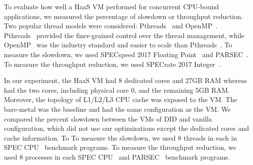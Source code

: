 



To evaluate how well a HaaS VM performed for concurrent
CPU-bound applications, we measured the percentage of slowdown
or throughput reduction. Two popular thread models were
considered: Pthreads~\cite{lewis:1998} and
OpenMP~\cite{dagum:1998}. Pthreads~\cite{lewis:1998} provided
the finer-grained control over the thread management, while
OpenMP~\cite{dagum:1998} was the industry standard and easier
to scale than Pthreads~\cite{lewis:1998}. To measure the
slowdown, we used SPECspeed 2017 Floating
Point~\cite{bucek:2018} and PARSEC~\cite{lewis:1998}. To
measure the throughput reduction, we used SPECrate 2017
Integer~\cite{bucek:2018}.

In our experiment, the HaaS VM had 8 dedicated cores and 27GB
RAM whereas \na had the two cores, including physical core 0,
and the remaining 5GB RAM. Moreover, the topology of L1/L2/L3
CPU cache was exposed to the VM. The bare-metal was the
baseline and had the same configuration as the VM. We compared
the percent slowdown between the VMs of DID and vanilla
configuration, which did not use our optimizations except the
dedicated cores and cache information. To To measure the
slowdown, we used 8 threads in each in SPEC
CPU~\cite{bucek:2018} benchmark programs. To measure the
throughput reduction, we used 8 processes in each SPEC
CPU~\cite{bucek:2018} and PARSEC~\cite{lewis:1998} benchmark
programs.

